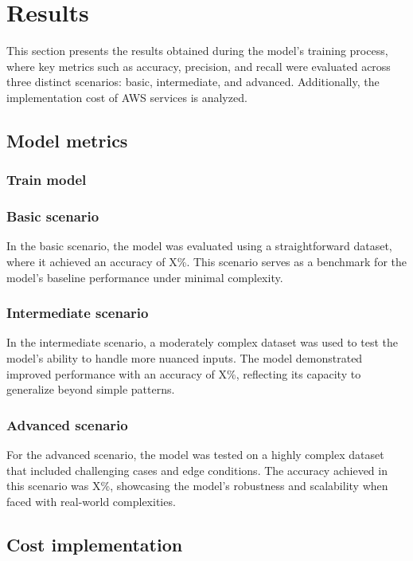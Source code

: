 \section{Results}

This section presents the results obtained during the model's training process, where key metrics such as accuracy, precision, and recall were evaluated across three distinct scenarios: basic, intermediate, and advanced. Additionally, the implementation cost of AWS services is analyzed.


\subsection{Model metrics}

\subsubsection{Train model}

\subsubsection{Basic scenario}

In the basic scenario, the model was evaluated using a straightforward dataset, where it achieved an accuracy of X\%. This scenario serves as a benchmark for the model's baseline performance under minimal complexity.

\subsubsection{Intermediate scenario}

In the intermediate scenario, a moderately complex dataset was used to test the model's ability to handle more nuanced inputs. The model demonstrated improved performance with an accuracy of X\%, reflecting its capacity to generalize beyond simple patterns.

\subsubsection{Advanced scenario}

For the advanced scenario, the model was tested on a highly complex dataset that included challenging cases and edge conditions. The accuracy achieved in this scenario was X\%, showcasing the model's robustness and scalability when faced with real-world complexities.

\subsection{Cost implementation}


